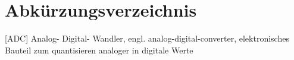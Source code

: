 \section*{Abkürzungsverzeichnis}


\begin{acronym}[HRTEM]

 [ADC] {Analog- Digital- Wandler, engl. \foreignlanguage{english}{analog-digital-converter}, elektronisches Bauteil zum quantisieren analoger in digitale Werte}

\end{acronym}